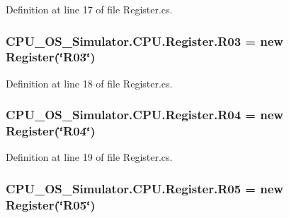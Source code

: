 Definition at line 17 of file Register.\+cs.

\hypertarget{class_c_p_u___o_s___simulator_1_1_c_p_u_1_1_register_a442530be904ccb54d0224eb441bccb27}{}
\subsubsection[{R03}]{ C\+P\+U\+\_\+\+O\+S\+\_\+\+Simulator.\+C\+P\+U.\+Register.\+R03 = new {\bf Register}(\char`\"{}R03\char`\"{})\hspace{0.3cm}{\ttfamily [static]}}\label{class_c_p_u___o_s___simulator_1_1_c_p_u_1_1_register_a442530be904ccb54d0224eb441bccb27}


Definition at line 18 of file Register.\+cs.

\hypertarget{class_c_p_u___o_s___simulator_1_1_c_p_u_1_1_register_aa86ab37f2ba652b534b8a6d4d338603e}{}
\subsubsection[{R04}]{ C\+P\+U\+\_\+\+O\+S\+\_\+\+Simulator.\+C\+P\+U.\+Register.\+R04 = new {\bf Register}(\char`\"{}R04\char`\"{})\hspace{0.3cm}{\ttfamily [static]}}\label{class_c_p_u___o_s___simulator_1_1_c_p_u_1_1_register_aa86ab37f2ba652b534b8a6d4d338603e}


Definition at line 19 of file Register.\+cs.

\hypertarget{class_c_p_u___o_s___simulator_1_1_c_p_u_1_1_register_a68c78defdae216e7110a284464e1ec64}{}
\subsubsection[{R05}]{ C\+P\+U\+\_\+\+O\+S\+\_\+\+Simulator.\+C\+P\+U.\+Register.\+R05 = new {\bf Register}(\char`\"{}R05\char`\"{})\hspace{0.3cm}{\ttfamily [static]}}\label{class_c_p_u___o_s___simulator_1_1_c_p_u_1_1_register_a68c78defdae216e7110a284464e1ec64}


